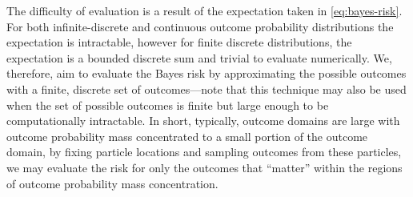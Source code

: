 \documentclass[aps,nofootinbib,twocolumn,superscriptaddress]{revtex4}
\begin{document}
The difficulty of evaluation is a result of the expectation taken in
\autoref{eq:bayes-risk}.
For both infinite-discrete and continuous outcome probability distributions the
expectation is intractable, however for finite discrete distributions, the
expectation is a bounded discrete sum and trivial to evaluate numerically. We,
therefore, aim to evaluate the Bayes risk by approximating the possible outcomes
with a finite, discrete set of outcomes---note that this technique may also be
used when the set of possible outcomes is finite but large enough to be
computationally intractable.
In short, typically, outcome domains are large with outcome probability mass
concentrated to a small portion of the outcome domain, by fixing particle
locations and sampling outcomes from these particles, we may evaluate the risk
for only the outcomes that ``matter'' within the regions of outcome probability
mass concentration.
\end{document}
